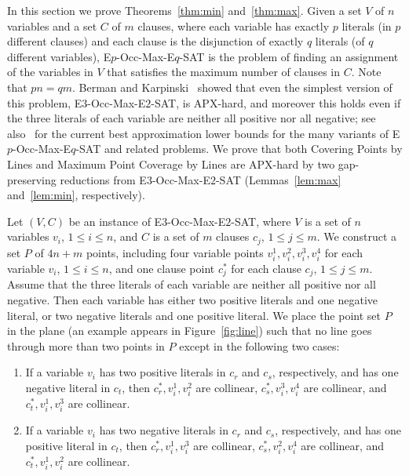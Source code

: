 \documentclass[letterpaper,11pt]{article}
\begin{document}
In this section we prove
Theorems~\ref{thm:min} and~\ref{thm:max}.
Given a set $V$ of $n$ variables and a set $C$ of $m$ clauses,
where each variable has exactly $p$ literals (in $p$ different clauses)
and each clause is the disjunction of exactly $q$ literals
(of $q$ different variables),
{\sc E$p$-Occ-Max-E$q$-SAT} is the problem of finding an assignment of
the variables in $V$ that satisfies the maximum number of clauses in $C$.
Note that $pn = qm$.
Berman and Karpinski~\cite{BK99} showed that
even the simplest version of this problem,
{\sc E$3$-Occ-Max-E$2$-SAT}, is APX-hard,
and moreover this holds even if
the three literals of each variable
are neither all positive nor all negative;
see also~\cite{BK03} for the current best approximation lower bounds for
the many variants of {\sc E$p$-Occ-Max-E$q$-SAT} and related problems.
We prove that both {\sc Covering Points by Lines} and {\sc Maximum Point Coverage
by Lines} are APX-hard by two gap-preserving reductions from {\sc E$3$-Occ-Max-E$2$-SAT}
(Lemmas~\ref{lem:max} and~\ref{lem:min}, respectively). 

Let $(V,C)$ be an instance of {\sc E$3$-Occ-Max-E$2$-SAT},
where $V$ is a set of $n$ variables $v_i$, $1 \le i \le n$,
and $C$ is a set of $m$ clauses $c_j$, $1 \le j \le m$.
We construct a set $P$ of $4n + m$ points,
including four variable points $v_i^1,v_i^2,v_i^3,v_i^4$
for each variable $v_i$, $1 \le i \le n$,
and one clause point $c_j^*$ for each clause $c_j$, $1 \le j \le m$.
Assume that the three literals of each variable
are neither all positive nor all negative.
Then each variable has either two positive literals and one negative literal,
or two negative literals and one positive literal.
We place the point set $P$ in the plane 
(an example appears in Figure~\ref{fig:line})
such that no line goes through more than two points in $P$
except in the following two cases:
\begin{enumerate} \itemsep -1pt
\item
If a variable $v_i$ has two positive literals in $c_r$ and $c_s$,
respectively,
and has one negative literal in $c_t$,
then $c_r^*,v_i^1,v_i^2$ are collinear,
$c_s^*,v_i^3,v_i^4$ are collinear,
and $c_t^*,v_i^1,v_i^3$ are collinear.
\item
If a variable $v_i$ has two negative literals in $c_r$ and $c_s$,
respectively,
and has one positive literal in $c_t$,
then $c_r^*,v_i^1,v_i^3$ are collinear,
$c_s^*,v_i^2,v_i^4$ are collinear,
and $c_t^*,v_i^1,v_i^2$ are collinear.
\end{enumerate}
\end{document}
